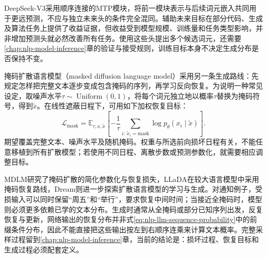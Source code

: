 DeepSeek-V3采用顺序连接的MTP模块，将前一模块表示与后续词元嵌入共同用于更远预测，不应与独立未来头的条件完全混同。辅助未来目标在部分代码、生成及算法任务上提供了收益证据，但收益受到模型规模、训练量和任务类型影响，并非增加预测头就必然改善所有任务。使用这些头提出多个候选词元，还需要\ref{chap:nlp-model-inference}章的验证与接受规则，训练目标本身不决定生成分布是否保持不变。

掩码扩散语言模型（masked diffusion language model）采用另一条生成路线：先规定怎样把完整文本逐步变成包含掩码的序列，再学习反向恢复。为说明一种常见设定，取噪声水平$\tau\sim\operatorname{Uniform}(0,1)$，将每个词元独立地以概率$\tau$替换为掩码符号，得到$\tilde x$。在线性遮蔽日程下，可用如下加权恢复目标：
\begin{equation}
 \mathcal L_{\mathrm{mask}}=
 \mathbb E_{\tau,x,\tilde x}
 \left[-\frac{1}{\tau}
 \sum_{i:\,\tilde x_i=\mathrm{mask}}
 \log p_\theta(x_i\mid\tilde x)\right].
 \label{eq:nlp-llm-masked-diffusion}
\end{equation}
期望覆盖完整文本、噪声水平及随机掩码。权重与所选前向损坏日程有关，不能任意移植到所有扩散模型；若使用不同日程、离散步数或预测参数化，就需要相应调整目标。

MDLM研究了掩码扩散的简化参数化与恢复损失，LLaDA在较大语言模型中采用掩码恢复路线，Dream则进一步探索扩散语言模型的学习与生成。对通知例子，受损输入可以同时保留“周五”和“举行”，要求恢复中间时间；当接近全掩码时，模型则必须更多依赖已学的文本分布。生成时通常从全掩码或部分已知序列出发，反复恢复与更新，网络输出的恢复分布并非式\eqref{eq:nlp-llm-sequence-probability}中的前缀条件分布，因此不能直接把这些输出按左到右顺序连乘来计算文本概率。完整采样过程留到\ref{chap:nlp-model-inference}章，当前的结论是：损坏过程、恢复目标和生成过程必须配套定义。
